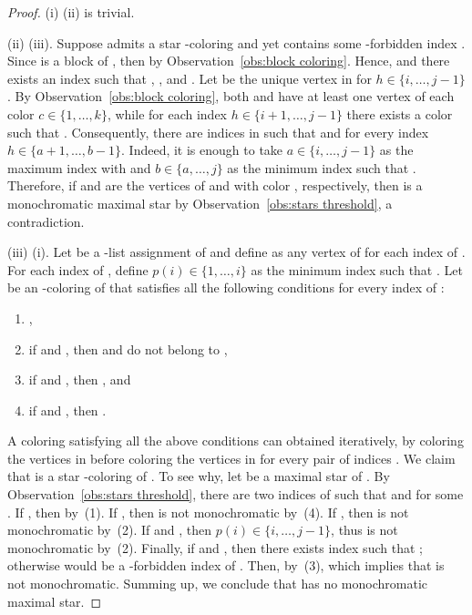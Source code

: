 \documentclass[a4paper, 11pt, oneside]{article}
\newcommand{\range}[3]{\ensuremath{#1 \in \{#2,\ldots,#3\}}}
\begin{document}
\begin{proof}
  (i)  (ii) is trivial.  

  (ii)  (iii).  Suppose  admits a star -coloring  and yet  contains some -forbidden index .  Since  is a block of , then  by Observation~\ref{obs:block coloring}.  Hence,  and there exists an index  such that , , and .  Let  be the unique vertex in  for \range{h}{i}{j-1}.  By Observation~\ref{obs:block coloring}, both  and  have at least one vertex of each color \range{c}{1}{k}, while for each index \range{h}{i+1}{j-1} there exists a color  such that .  Consequently, there are indices  in  such that  and  for every index \range{h}{a+1}{b-1}.  Indeed, it is enough to take \range{a}{i}{j-1} as the maximum index with  and \range{b}{a}{j} as the minimum index such that .  Therefore, if  and  are the vertices of  and  with color , respectively, then  is a monochromatic maximal star by Observation~\ref{obs:stars threshold}, a contradiction.

  (iii)  (i).  Let  be a -list assignment of  and define  as any vertex of  for each index  of .  For each index  of , define \range{p(i)}{1}{i} as the minimum index such that .  Let  be an -coloring of  that satisfies all the following conditions for every index  of :
  \begin{enumerate}[(1)]
    \item ,
    \item if  and , then  and  do not belong to ,
    \item if  and , then , and 
    \item if  and , then .
  \end{enumerate}
  A coloring satisfying all the above conditions can obtained iteratively, by coloring the vertices in  before coloring the vertices in  for every pair of indices .  We claim that  is a star -coloring of .  To see why, let  be a maximal star of .  By Observation~\ref{obs:stars threshold}, there are two indices  of  such that  and  for some .  If , then  by~(1).  If , then  is not monochromatic by~(4).  If , then  is not monochromatic by~(2).  If  and , then \range{p(i)}{i}{j-1}, thus  is not monochromatic by~(2).  Finally, if  and , then there exists index  such that ; otherwise  would be a -forbidden index of .  Then, by~(3),  which implies that  is not monochromatic.  Summing up, we conclude that  has no monochromatic maximal star.
\end{proof}
\end{document}
